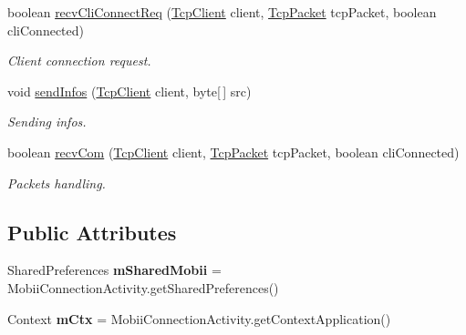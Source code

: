 \begin{DoxyCompactItemize}
boolean \hyperlink{classcom_1_1mobii_1_1protocol_1_1_tcp_packet_a59a03d4bf78f73aa50ad633b5080c583}{recv\-Cli\-Connect\-Req} (\hyperlink{classcom_1_1mobii_1_1connection_1_1_tcp_client}{Tcp\-Client} client, \hyperlink{classcom_1_1mobii_1_1protocol_1_1_tcp_packet}{Tcp\-Packet} tcp\-Packet, boolean cli\-Connected)
\begin{DoxyCompactList}\small\item\em Client connection request. \end{DoxyCompactList}\item 
void \hyperlink{classcom_1_1mobii_1_1protocol_1_1_tcp_packet_a60c9a7afa84b32b68452e23f5dcd48f7}{send\-Infos} (\hyperlink{classcom_1_1mobii_1_1connection_1_1_tcp_client}{Tcp\-Client} client, byte\mbox{[}$\,$\mbox{]} src)
\begin{DoxyCompactList}\small\item\em Sending infos. \end{DoxyCompactList}\item 
boolean \hyperlink{classcom_1_1mobii_1_1protocol_1_1_tcp_packet_a0f1accd6b90f5057067a87689e6a80dd}{recv\-Com} (\hyperlink{classcom_1_1mobii_1_1connection_1_1_tcp_client}{Tcp\-Client} client, \hyperlink{classcom_1_1mobii_1_1protocol_1_1_tcp_packet}{Tcp\-Packet} tcp\-Packet, boolean cli\-Connected)
\begin{DoxyCompactList}\small\item\em Packets handling. \end{DoxyCompactList}\end{DoxyCompactItemize}
\subsection*{Public Attributes}
\begin{DoxyCompactItemize}
\item 
\hypertarget{classcom_1_1mobii_1_1protocol_1_1_tcp_packet_a630871c14eba897405b12dceb6c43373}{Shared\-Preferences {\bfseries m\-Shared\-Mobii} = Mobii\-Connection\-Activity.\-get\-Shared\-Preferences()}\label{classcom_1_1mobii_1_1protocol_1_1_tcp_packet_a630871c14eba897405b12dceb6c43373}

\item 
\hypertarget{classcom_1_1mobii_1_1protocol_1_1_tcp_packet_a00a139f95f26c9012d8e2a4246fec367}{Context {\bfseries m\-Ctx} = Mobii\-Connection\-Activity.\-get\-Context\-Application()}\label{classcom_1_1mobii_1_1protocol_1_1_tcp_packet_a00a139f95f26c9012d8e2a4246fec367}

\end{DoxyCompactItemize}


